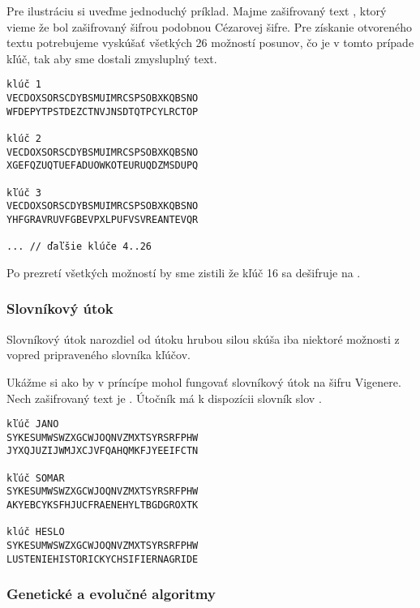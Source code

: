 Pre ilustráciu si uveďme jednoduchý príklad. Majme zašifrovaný text , ktorý vieme že bol zašifrovaný šifrou podobnou Cézarovej šifre.
Pre získanie otvoreného textu potrebujeme vyskúšať všetkých 26 možností posunov, čo je v tomto prípade kľúč, tak aby sme dostali zmysluplný text.

\begin{verbatim}
klúč 1
VECDOXSORSCDYBSMUIMRCSPSOBXKQBSNO
WFDEPYTPSTDEZCTNVJNSDTQTPCYLRCTOP

klúč 2
VECDOXSORSCDYBSMUIMRCSPSOBXKQBSNO
XGEFQZUQTUEFADUOWKOTEURUQDZMSDUPQ

kľúč 3
VECDOXSORSCDYBSMUIMRCSPSOBXKQBSNO
YHFGRAVRUVFGBEVPXLPUFVSVREANTEVQR

... // ďaľšie klúče 4..26
\end{verbatim}

Po prezretí všetkých možností by sme zistili že kľúč 16 sa dešifruje na .


\subsubsection{Slovníkový útok}
Slovníkový útok narozdiel od útoku hrubou silou skúša iba niektoré možnosti z vopred pripraveného slovníka kľúčov.

Ukážme si ako by v príncípe mohol fungovať slovníkový útok na šifru Vigenere.
Nech zašifrovaný text je . Útočník má k dispozícii slovník slov .

\begin{verbatim}
kľúč JANO
SYKESUMWSWZXGCWJOQNVZMXTSYRSRFPHW
JYXQJUZIJWMJXCJVFQAHQMKFJYEEIFCTN

kľúč SOMAR
SYKESUMWSWZXGCWJOQNVZMXTSYRSRFPHW
AKYEBCYKSFHJUCFRAENEHYLTBGDGROXTK

klúč HESLO
SYKESUMWSWZXGCWJOQNVZMXTSYRSRFPHW
LUSTENIEHISTORICKYCHSIFIERNAGRIDE
\end{verbatim}

\subsubsection{Genetické a evolučné algoritmy}












